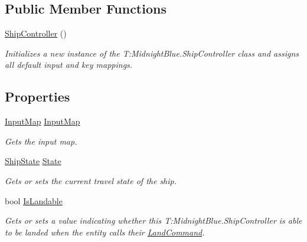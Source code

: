 \subsection*{Public Member Functions}
\begin{DoxyCompactItemize}
\item 
\hyperlink{class_midnight_blue_1_1_ship_controller_a07d38d2b98b9b132f1eff9cc8879f278}{Ship\+Controller} ()
\begin{DoxyCompactList}\small\item\em Initializes a new instance of the T\+:\+Midnight\+Blue.\+Ship\+Controller class and assigns all default input and key mappings. \end{DoxyCompactList}\end{DoxyCompactItemize}
\subsection*{Properties}
\begin{DoxyCompactItemize}
\item 
\hyperlink{class_midnight_blue_1_1_engine_1_1_i_o_1_1_input_map}{Input\+Map} \hyperlink{class_midnight_blue_1_1_ship_controller_a50136c59b5a0e80d280aec4b6de46414}{Input\+Map}
\begin{DoxyCompactList}\small\item\em Gets the input map. \end{DoxyCompactList}\item 
\hyperlink{namespace_midnight_blue_a46fd3250d826e0dec67892328d5b368c}{Ship\+State} \hyperlink{class_midnight_blue_1_1_ship_controller_a032da447be3b66b7998349ae825d4edb}{State}
\begin{DoxyCompactList}\small\item\em Gets or sets the current travel state of the ship. \end{DoxyCompactList}\item 
bool \hyperlink{class_midnight_blue_1_1_ship_controller_ad07cfa737db5a712aedcc2528b953683}{Is\+Landable}
\begin{DoxyCompactList}\small\item\em Gets or sets a value indicating whether this T\+:\+Midnight\+Blue.\+Ship\+Controller is able to be landed when the entity calls their \hyperlink{class_midnight_blue_1_1_land_command}{Land\+Command}. \end{DoxyCompactList}\end{DoxyCompactItemize}


